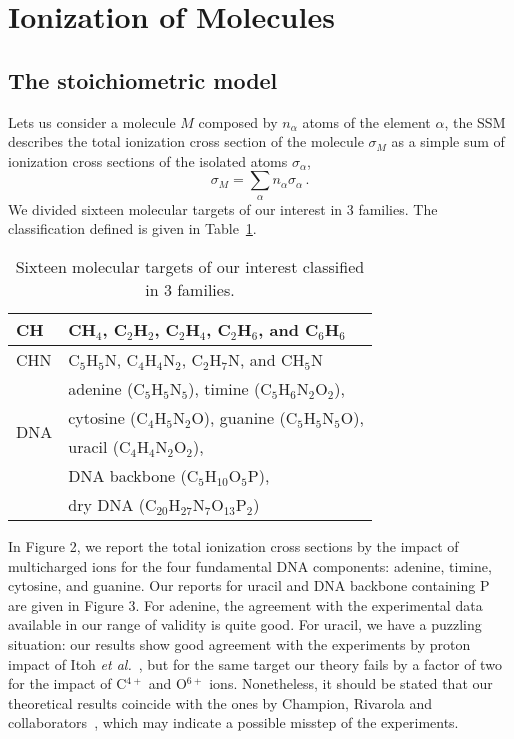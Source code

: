 \documentclass[preprint,12pt]{article}
\begin{document}
\section{Ionization of Molecules}

\subsection{The stoichiometric model}

Lets us consider a molecule $M$ composed by $n_{\alpha}$ atoms of the
element $\alpha$, the SSM describes the total ionization cross section 
of the molecule $\sigma_{M}$ as a simple sum of ionization cross 
sections of the isolated atoms $\sigma_{\alpha}$, 
\begin{equation}
 \sigma_{M}=\sum\limits_{\alpha}n_{\alpha}\sigma_{\alpha}\,.  
 \label{eq:sumion}
\end{equation}
We divided sixteen molecular targets of our interest in 3 families. 
The classification defined is given in Table~\ref{tab:families}.
\begin{table}
\begin{center}
\begin{tabular}{|p{}|p{}|}
\hline
 CH  & CH$_4$, C$_2$H$_2$, C$_2$H$_4$, C$_2$H$_6$, and C$_6$H$_6$ \\
\hline
 CHN & C$_5$H$_5$N, C$_4$H$_4$N$_2$, C$_2$H$_7$N, and CH$_5$N \\
\hline
 \multirow{4}{*}{DNA} & adenine (C$_5$H$_5$N$_5$), 
                        timine (C$_5$H$_6$N$_2$O$_2$), \\
     & cytosine (C$_4$H$_5$N$_2$O), guanine (C$_5$H$_5$N$_5$O), \\
     & uracil (C$_4$H$_4$N$_2$O$_2$), \\
     & DNA backbone (C$_5$H$_{10}$O$_5$P), \\
     & dry DNA (C$_{20}$H$_{27}$N$_7$O$_{13}$P$_2$)\\
\hline
\end{tabular}
\caption{Sixteen molecular targets of our interest classified in 3 
\label{tab:families}
families.}
\end{center}
\end{table}

In Figure 2, we report the total ionization cross sections by the 
impact of multicharged ions for the four fundamental DNA components: 
adenine, timine, cytosine, and guanine. Our reports for uracil and 
DNA backbone containing P are given in Figure 3. For adenine, the 
agreement with the experimental data available in our range of validity 
is quite good. For uracil, we have a puzzling situation: our results 
show good agreement with the experiments by proton impact of Itoh 
{\it et al.}~\cite{itoh2013}, but for the same target our theory fails 
by a factor of two for the impact of C$^{4+}$ and O$^{6+}$ ions. 
Nonetheless, it should be stated that our theoretical results coincide 
with the ones by Champion, Rivarola and 
collaborators~\cite{champion2012,agnihotri2012}, which may indicate a 
possible misstep of the experiments. 
\end{document}
